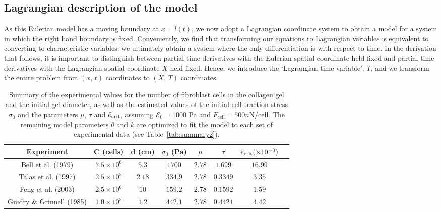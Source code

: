 \subsection{Lagrangian description of the model}

As this Eulerian model has a moving boundary at $x = l(t)$, we now adopt a Lagrangian coordinate system to obtain a model for a system in which the right hand boundary is fixed. Conveniently, we find that transforming our equations to Lagrangian variables is equivalent to converting to characteristic variables: we ultimately obtain a system where the only differentiation is with respect to time. In the derivation that follows, it is important to distinguish between partial time derivatives with the Eulerian spatial coordinate held fixed and partial time derivatives with the Lagrangian spatial coordinate  $X$ held fixed. Hence, we introduce the `Lagrangian time variable', $T$, and we transform the entire problem from $(x,\,t)$ coordinates to $(X,\,T)$ coordinates.

\begin{center}
\begin{table*}[t]
\caption{Summary of the experimental values for the number of fibroblast cells in the collagen gel and the initial gel diameter, as well as the estimated values of the initial cell traction stress $\sigma_0$ and the parameters $\bar{\mu}$, $\bar{\tau}$ and $\bar{e}_{\rm crit}$, assuming $\mathcal{E}_{0} = 1000$ Pa and $F_\text{cell}=500n$N/cell. The remaining model parameters $\bar{\theta}$ and $\bar{k}$ are optimized to fit the model to each set of experimental data (see Table~\ref{tab:summary2}).}
\centering
\begin{tabular}{|c|c|c|c|c|c|c|c|}
\hline
{Experiment}  &{C (cells)}  &{d (cm)}  &{$\sigma_0$ (Pa)}  &{$\bar{\mu}$}  &{$\bar{\tau}$}  &{$\bar{e}_{\rm crit} (\times 10^{-3})$}\\
\hline
{Bell et al. (1979)}        &{$7.5\times 10^{6}$} &{$5.3$}  &{$1700$}  &{$2.78$} &{$1.699$}     &{$16.99$}\\
{Talas et al. (1997)}       &{$2.5\times 10^{5}$} &{$2.18$} &{$334.9$} &{$2.78$} &{$0.3349$}     &{$3.35$}\\
{Feng et al. (2003)}        &{$2.5\times 10^{6}$} &{$10$}   &{$159.2$} &{$2.78$} &{$0.1592$}     &{$1.59$}\\
{Guidry \& Grinnell (1985)} &{$1.0\times 10^{5}$} &{$1.2$}  &{$442.1$} &{$2.78$} &{$0.4421$}     &{$4.42$}\\
\hline
\end{tabular}
\label{tab:summary}
\end{table*}
\end{center}

